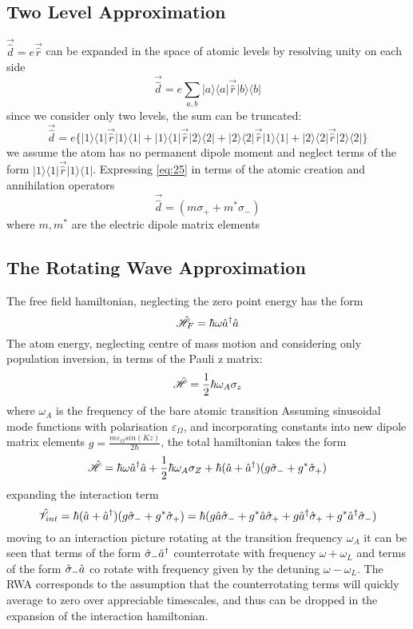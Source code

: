 \subsection{Two Level Approximation}
$\vec{\hat{d}} = e \vec{\hat{r}}$ can be expanded in the space of atomic levels by resolving unity on each side
\begin{equation}
	\vec{\hat{d}} = e \sum_{a, b} | a \rangle \langle a | \vec{\hat{r} }| b \rangle \langle b |
\end{equation}
since we consider only two levels, the sum can be truncated: 
\begin{equation}
	\vec{\hat{d}} = e\{| 1 \rangle \langle 1|\vec{\hat{r}} | 1 \rangle \langle 1 | + | 1 \rangle \langle 1|\vec{\hat{r}} | 2 \rangle \langle 2 | + | 2 \rangle \langle 2|\vec{\hat{r}} | 1 \rangle \langle 1 | + | 2 \rangle \langle 2|\vec{\hat{r}} | 2 \rangle \langle 2 | \}
\label{eq:25}
\end{equation}
we assume the atom has no permanent dipole moment and neglect terms of the form $| 1 \rangle \langle 1|\vec{\hat{r}} | 1 \rangle \langle 1 |$. Expressing \cref{eq:25} in terms of the atomic creation and annihilation operators
\begin{equation}
	\vec{\hat{d}} = (m\sigma_+ + m^* \sigma_-)
\end{equation}
where $m, m^*$ are the electric dipole matrix elements
\subsection{The Rotating Wave Approximation}
The free field hamiltonian, neglecting the zero point energy has the form
\begin{equation}
	\hat{\mathscr{H}}_F =  \hbar \omega \hat{a}^\dagger \hat{a}
\end{equation}
The atom energy, neglecting centre of mass motion and considering only population inversion, in terms of the Pauli z matrix:
\begin{equation}
	\hat{\mathscr{H}} = \frac {1} {2} \hbar \omega_A \sigma_z
\end{equation}
where $\omega_A$ is the frequency of the bare atomic transition
Assuming sinusoidal mode functions with polarisation $\varepsilon_\Omega$, and incorporating constants into new dipole matrix elements $g = \frac{m \varepsilon_\Omega sin(Kz)} {2 \hbar}$, the total hamiltonian takes the form 
\begin{equation}
	\hat{\mathscr{H}} = \hbar \omega \hat{a}^\dagger \hat{a} +\frac{1}{2} \hbar \omega_A \sigma_Z + \hbar (\hat{a} +\hat{a}^\dagger)(g\hat{\sigma}_-+g^*\hat{\sigma}_+)
\end{equation}
expanding the interaction term
\begin{equation}
	\hat{\mathscr{V}}_{int} = \hbar (\hat{a} +\hat{a}^\dagger)(g\hat{\sigma}_-+g^*\hat{\sigma}_+) =  \hbar (g \hat{a} \hat{\sigma}_- + g^* \hat{a} \hat{\sigma}_+ + g \hat{a}^\dagger \hat{\sigma}_+ +g^* \hat{a}^\dagger\hat{\sigma}_-)
\end{equation}
moving to an interaction picture rotating at the transition frequency $\omega_A$ it can be seen that terms of the form $\hat{\sigma}_- \hat{a}^\dagger $ counterrotate with frequency $\omega + \omega_L$ and terms of the form $ \hat{\sigma}_- \hat{a}$ co rotate with frequency given by the detuning $\omega-\omega_L$. The RWA corresponds to the assumption that the counterrotating terms will quickly average to zero over appreciable timescales, and thus can be dropped in the expansion of the interaction hamiltonian.
